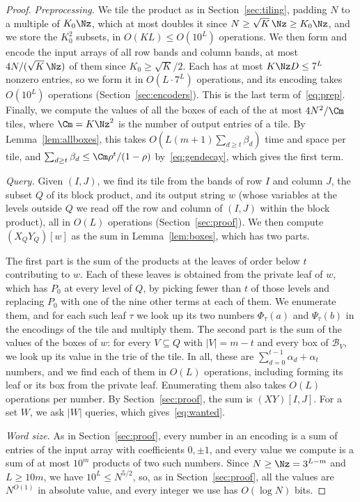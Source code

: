 \begin{proof}
\emph{Preprocessing.} We tile the product as in Section~\ref{sec:tiling}, padding $N$ to a multiple of $K_0\Nz$, which at most doubles it since $N\ge\sqrt K\,\Nz\ge K_0\Nz$, and we store the $K_0^2$ subsets, in $O(KL)\le O(10^L)$ operations. We then form and encode the input arrays of all row bands and column bands, at most $4N/(\sqrt K\,\Nz)$ of them since $K_0\ge\sqrt K/2$. Each has at most $K\Nz D\le7^L$ nonzero entries, so we form it in $O(L\cdot7^L)$ operations, and its encoding takes $O(10^L)$ operations (Section~\ref{sec:encoders}). This is the last term of~\eqref{eq:prep}. Finally, we compute the values of all the boxes of each of the at most $4N^2/\Cm$ tiles, where $\Cm=K\Nz^2$ is the number of output entries of a tile. By Lemma~\ref{lem:allboxes}, this takes $O(L(m+1)\sum_{d\ge t}\beta_d)$ time and space per tile, and $\sum_{d\ge t}\beta_d\le\Cm\rho^t/(1-\rho)$ by~\eqref{eq:gendecay}, which gives the first term.

\emph{Query.} Given $(I,J)$, we find its tile from the bands of row $I$ and column $J$, the subset $Q$ of its block product, and its output string $w$ (whose variables at the levels outside $Q$ we read off the row and column of $(I,J)$ within the block product), all in $O(L)$ operations (Section~\ref{sec:proof}). We then compute $(X_QY_Q)[w]$ as the sum in Lemma~\ref{lem:boxes}, which has two parts.

The first part is the sum of the products at the leaves of order below $t$ contributing to $w$. Each of these leaves is obtained from the private leaf of $w$, which has $P_0$ at every level of $Q$, by picking fewer than $t$ of those levels and replacing $P_0$ with one of the nine other terms at each of them. We enumerate them, and for each such leaf $\tau$ we look up its two numbers $\Phi_\tau(a)$ and $\Psi_\tau(b)$ in the encodings of the tile and multiply them. The second part is the sum of the values of the boxes of $w$: for every $V\subseteq Q$ with $|V|=m-t$ and every box of $\mathcal B_V$, we look up its value in the trie of the tile. In all, these are $\sum_{d=0}^{t-1}\alpha_d+\alpha_t$ numbers, and we find each of them in $O(L)$ operations, including forming its leaf or its box from the private leaf. Enumerating them also takes $O(L)$ operations per number. By Section~\ref{sec:proof}, the sum is $(XY)[I,J]$. For a set $W$, we ask $|W|$ queries, which gives~\eqref{eq:wanted}.

\emph{Word size.} As in Section~\ref{sec:proof}, every number in an encoding is a sum of entries of the input array with coefficients $0,\pm1$, and every value we compute is a sum of at most $10^m$ products of two such numbers. Since $N\ge\Nz=3^{L-m}$ and $L\ge10m$, we have $10^L\le N^{5/2}$, so, as in Section~\ref{sec:proof}, all the values are $N^{O(1)}$ in absolute value, and every integer we use has $O(\log N)$ bits.
\end{proof}

